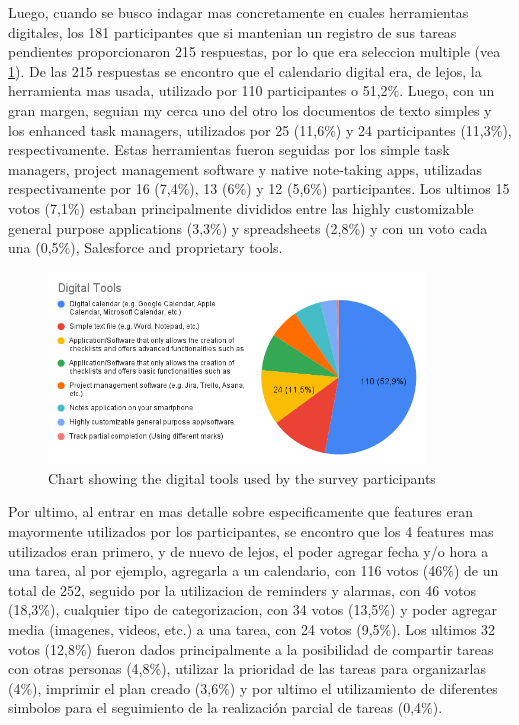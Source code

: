 Luego, cuando se busco indagar mas concretamente en cuales herramientas digitales, los 181 participantes que si mantenian un registro de sus tareas pendientes proporcionaron 215 respuestas, por lo que era seleccion multiple (vea \ref{fig:surveyDigitalTools}). De las 215 respuestas se encontro que el calendario digital era, de lejos, la herramienta mas usada,  utilizado por 110 participantes o 51,2\%. Luego, con un gran margen, seguian my cerca uno del otro los documentos de texto simples y los enhanced task managers, utilizados por 25 (11,6\%) y 24 participantes (11,3\%), respectivamente. Estas herramientas fueron seguidas por los simple task managers, project management software y native note-taking apps, utilizadas respectivamente por 16 (7,4\%), 13 (6\%) y 12 (5,6\%) participantes. Los ultimos 15 votos (7,1\%) estaban principalmente divididos entre las highly customizable general purpose applications (3,3\%) y spreadsheets (2,8\%) y con un voto cada una (0,5\%), Salesforce and proprietary tools.

\FloatBarrier
\begin{figure}[!htbp]
    \centering
    \includegraphics[width=10cm]{Images/General/03_user_centered_design/Survey/DigitalTools.png}
    \caption{Chart showing the digital tools used by the survey participants}
    \label{fig:surveyDigitalTools}
\end{figure}
\FloatBarrier

Por ultimo, al entrar en mas detalle sobre especificamente que features eran mayormente utilizados por los participantes, se encontro que los 4 features mas utilizados eran primero, y de nuevo de lejos, el poder agregar fecha y/o hora a una tarea, al por ejemplo, agregarla a un calendario, con 116 votos (46\%) de un total de 252, seguido por la utilizacion de reminders y alarmas, con 46 votos (18,3\%), cualquier tipo de categorizacion, con 34 votos (13,5\%) y poder agregar media (imagenes, videos, etc.) a una tarea, con 24 votos (9,5\%). Los ultimos 32 votos (12,8\%) fueron dados principalmente a la posibilidad de compartir tareas con otras personas (4,8\%), utilizar la prioridad de las tareas para organizarlas (4\%), imprimir el plan creado (3,6\%) y por ultimo el utilizamiento de diferentes simbolos para el seguimiento de la realización parcial de tareas (0,4\%).

